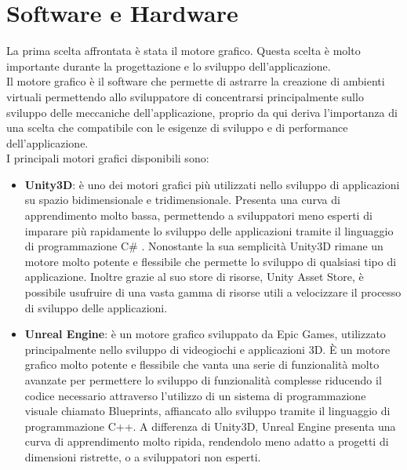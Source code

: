 \section{Software e Hardware}
\label{sec:software-hardware}

La prima scelta affrontata è stata il motore grafico. Questa scelta è molto
importante durante la progettazione e lo sviluppo dell'applicazione.\\ Il motore
grafico è il software che permette di astrarre la creazione di ambienti virtuali
permettendo allo sviluppatore di concentrarsi principalmente sullo sviluppo
delle meccaniche dell'applicazione, proprio da qui deriva l'importanza di una scelta
che compatibile con le esigenze di sviluppo e di performance dell'applicazione.\\
I principali motori grafici disponibili sono:

\begin{itemize}
  \item \textbf{Unity3D}: è uno dei motori grafici più utilizzati nello sviluppo
    di applicazioni su spazio bidimensionale e tridimensionale. Presenta una
    curva di apprendimento molto bassa, permettendo a sviluppatori meno esperti di
    imparare più rapidamente lo sviluppo delle applicazioni tramite il linguaggio
    di programmazione C\# . Nonostante la sua semplicità Unity3D rimane un
    motore molto potente e flessibile che permette lo sviluppo di qualsiasi tipo
    di applicazione. Inoltre grazie al suo store di risorse, Unity Asset Store, è
    possibile usufruire di una vasta gamma di risorse utili a velocizzare il processo
    di sviluppo delle applicazioni.

  \item \textbf{Unreal Engine}: è un motore grafico sviluppato da Epic Games,
    utilizzato principalmente nello sviluppo di videogiochi e applicazioni 3D. È
    un motore grafico molto potente e flessibile che vanta una serie di funzionalità
    molto avanzate per permettere lo sviluppo di funzionalità complesse riducendo
    il codice necessario attraverso l'utilizzo di un sistema di programmazione visuale
    chiamato Blueprints, affiancato allo sviluppo tramite il linguaggio di
    programmazione C++. A differenza di Unity3D, Unreal Engine presenta una
    curva di apprendimento molto ripida, rendendolo meno adatto a progetti di dimensioni
    ristrette, o a sviluppatori non esperti.
\end{itemize}

